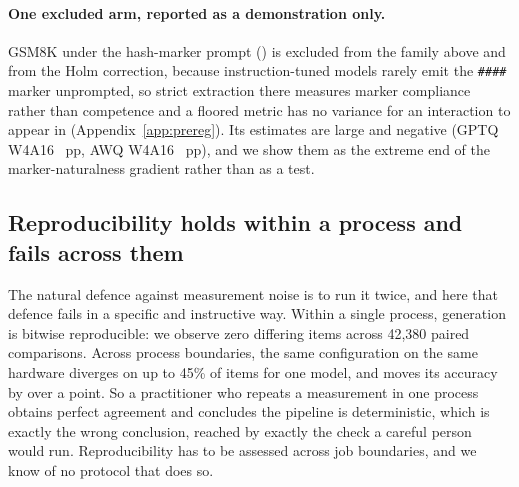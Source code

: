 \documentclass[conference]{IEEEtran}
\begin{document}
\paragraph{One excluded arm, reported as a demonstration only.}
GSM8K under the hash-marker prompt (\hThreeGsmDemoExcluded) is excluded from the
family above and from the Holm correction, because instruction-tuned models
rarely emit the \texttt{\#\#\#\#} marker unprompted, so strict extraction there measures
marker compliance rather than competence and a floored metric has no variance for
an interaction to appear in (Appendix~\ref{app:prereg}). Its estimates are large and
negative (GPTQ W4A16 \hThreeGsmDemoGptqFour{}~pp, AWQ W4A16
\hThreeGsmDemoAwq{}~pp), and we show them as the extreme end of the
marker-naturalness gradient rather than as a test.

\subsection{Reproducibility holds within a process and fails across them}
\label{sec:crossjob}


The natural defence against measurement noise is to run it twice, and here that
defence fails in a specific and instructive way. Within a single process,
generation is bitwise reproducible: we observe zero differing items across
42{,}380 paired comparisons. Across process boundaries, the same configuration on
the same hardware diverges on up to 45\% of items for one model, and moves its
accuracy by over a point. So a practitioner who repeats a measurement in one
process obtains perfect agreement and concludes the pipeline is deterministic,
which is exactly the wrong conclusion, reached by exactly the check a careful
person would run. Reproducibility has to be assessed across job boundaries, and
we know of no protocol that does so.
\end{document}
